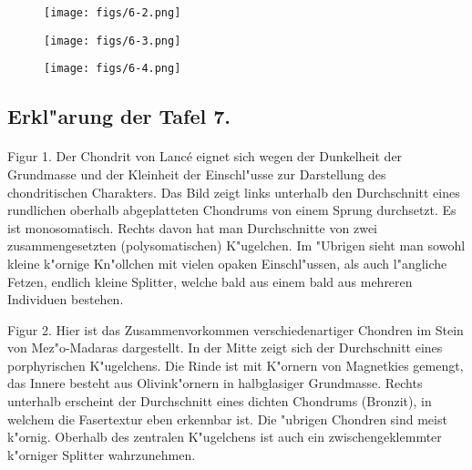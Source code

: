 \documentclass[a4paper, 11pt, oneside, polutonikogreek, german]{article}
\begin{document}
\vspace*{\fill}
\begin{figure}[H]
\centering
\texttt{[image: figs/6-2.png]}
\caption{}
\end{figure}
\vspace*{\fill}
\clearpage

\vspace*{\fill}
\begin{figure}[H]
\centering
\texttt{[image: figs/6-3.png]}
\caption{}
\end{figure}
\vspace*{\fill}
\clearpage

\vspace*{\fill}
\begin{figure}[H]
\centering
\texttt{[image: figs/6-4.png]}
\caption{}
\end{figure}
\vspace*{\fill}
\clearpage

\subsection{Erkl"arung der Tafel 7.}
\paragraph{}
Figur 1. Der Chondrit von Lancé eignet sich wegen der Dunkelheit der Grundmasse und der Kleinheit der Einschl"usse zur Darstellung des chondritischen Charakters. Das Bild zeigt links unterhalb den Durchschnitt eines rundlichen oberhalb abgeplatteten Chondrums von einem Sprung durchsetzt. Es ist monosomatisch. Rechts davon hat man Durchschnitte von zwei zusammengesetzten (polysomatischen) K"ugelchen. Im "Ubrigen sieht man sowohl kleine k"ornige Kn"ollchen mit vielen opaken Einschl"ussen, als auch l"angliche Fetzen, endlich kleine Splitter, welche bald aus einem bald aus mehreren Individuen bestehen.

Figur 2. Hier ist das Zusammenvorkommen verschiedenartiger Chondren im Stein von Mez"o-Madaras dargestellt. In der Mitte zeigt sich der Durchschnitt eines porphyrischen K"ugelchens. Die Rinde ist mit K"ornern von Magnetkies gemengt, das Innere besteht aus Olivink"ornern in halbglasiger Grundmasse. Rechts unterhalb erscheint der Durchschnitt eines dichten Chondrums (Bronzit), in welchem die Fasertextur eben erkennbar ist. Die "ubrigen Chondren sind meist k"ornig. Oberhalb des zentralen K"ugelchens ist auch ein zwischengeklemmter k"orniger Splitter wahrzunehmen.
\end{document}
